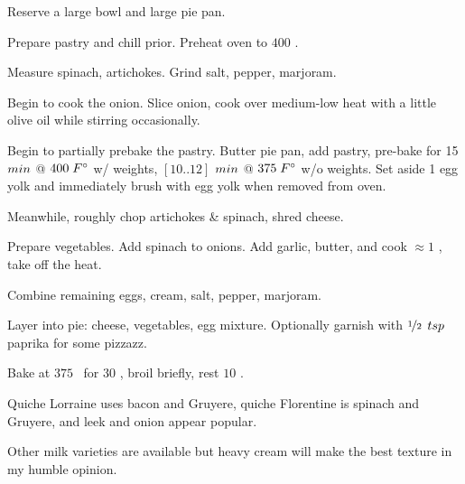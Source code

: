 \begin{preparation}
\item Reserve a large bowl and large pie pan.

\item Prepare pastry and chill prior.
	Preheat oven to $400$ \Fahrenheit.

\item Measure spinach, artichokes. Grind salt, pepper, marjoram.

\item Begin to cook the onion.
	Slice onion, cook over medium-low heat with a little olive oil while stirring occasionally.

\item Begin to partially prebake the pastry.
	Butter pie pan, add pastry, pre-bake for 15 $\minute$ @ $400\;\Fahrenheit$ w/ weights, $[10..12]$  $\minute$ @ $375\;\Fahrenheit$ w/o weights.
	Set aside 1 egg yolk and immediately brush with egg yolk when removed from oven.

\item Meanwhile, roughly chop artichokes \& spinach, shred cheese.

\item Prepare vegetables.
	Add spinach to onions.
	Add garlic, butter, and cook $\approx 1$ \minute, take off the heat.

\item Combine remaining eggs, cream, salt, pepper, marjoram.

\item Layer into pie: cheese, vegetables, egg mixture.
	Optionally garnish with $\onehalf$ $\teaspoon$ paprika for some pizzazz.

\item Bake at $375$ \Fahrenheit~for $30$ \minute, broil briefly, rest $10$ \minute.
\end{preparation}


\begin{variation}
\item Quiche Lorraine uses bacon and Gruyere, quiche Florentine is spinach and Gruyere, and leek and onion appear popular.

\item Other milk varieties are available but heavy cream will make the best texture in my humble opinion.
\end{variation}


\recipeend%

